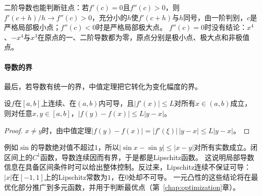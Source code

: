 二阶导数也能判断驻点：若$f'(c)=0$且$f''(c)>0$，则$f'(c+h)/h\to f''(c)>0$，充分小的$h$使$f'(c+h)$与$h$同号，由一阶判别，$c$是严格局部极小点；$f''(c)<0$时是严格局部极大点。
$f''(c)=0$时没有结论：$x^4$、$-x^4$与$x^3$在原点的一、二阶导数都为零，原点分别是极小点、极大点和非极值点。

\paragraph{导数的界}
最后，若导数有统一的界，中值定理把它转化为变化幅度的界。
\begin{theorem}[有界导数与Lipschitz条件]
\label{thm:analysis-bounded-derivative-lipschitz}
设$f$在$[a,b]$上连续、在$(a,b)$内可导，且$|f'(x)|\leq L$对所有$x\in(a,b)$成立，则对任意$x,y\in[a,b]$，$|f(y)-f(x)|\leq L|y-x|$。
\end{theorem}
\begin{proof}
$x\neq y$时，由中值定理$|f(y)-f(x)|=|f'(\xi)|\,|y-x|\leq L|y-x|$。
\end{proof}
例如$\sin$的导数绝对值不超过$1$，所以$|\sin x-\sin y|\leq|x-y|$对所有实数成立。闭区间上的$C^1$函数，导数连续因而有界，于是都是Lipschitz函数。
这说明局部导数信息在具备区间条件时可以给出整体控制。反过来，Lipschitz连续不保证可导：$|x|$在$[-1,1]$上的Lipschitz常数为$1$，在$0$处却不可导。
一元凸性的这些结论将在最优化部分推广到多元函数，并用于判断最优点（第~\ref{chap:optimization}章）。
